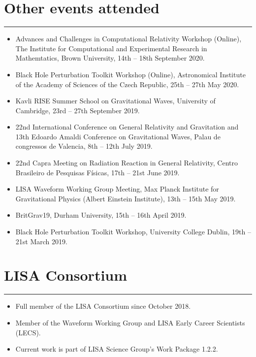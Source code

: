 \documentclass[10.5pt, oneside]{article}   	%
\begin{document}
 
{\color{Sectioncolour}
\section*{Other events attended}
\vspace{-3mm}
\noindent\rule{\linewidth}{0.6pt}}
\begin{itemize}
\item Advances and Challenges in Computational Relativity Workshop (Online), The Institute for Computational and Experimental Research in Mathemtatics, Brown University, 14th -- 18th September 2020.
\item Black Hole Perturbation Toolkit Workshop (Online), Astronomical Institute of the Academy of Sciences of the Czech Republic, 25th -- 27th May 2020.
\item Kavli RISE Summer School on Gravitational Waves, University of Cambridge, 23rd -- 27th September 2019.
\item 22nd International Conference on General Relativity and Gravitation and 13th Edoardo Amaldi Conference on Gravitational Waves, Palau de congressos de Valencia, 8th -- 12th July 2019.
\item 22nd Capra Meeting on Radiation Reaction in General Relativity, Centro Brasileiro de Pesquisas Físicas, 17th -- 21st June 2019.
\item LISA Waveform Working Group Meeting, Max Planck Institute for Gravitational Physics (Albert Einstein Institute), 13th -- 15th May 2019.
\item BritGrav19, Durham University, 15th -- 16th April 2019.
\item Black Hole Perturbation Toolkit Workshop, University College Dublin, 19th -- 21st March 2019.
\end{itemize} 

{\color{Sectioncolour}
\section*{LISA Consortium}
\vspace{-3mm}
\noindent\rule{\linewidth}{0.6pt}}
\begin{itemize}
\item Full member of the LISA Consortium since October 2018.
\item Member of the Waveform Working Group and LISA Early Career Scientists (LECS).
\item Current work is part of LISA Science Group's Work Package 1.2.2.
\end{itemize} 
\end{document}
